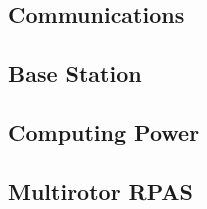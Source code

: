 \documentclass[10pt,letterpaper]{article}
\begin{document}
\subsection{Communications}\label{communications}


\subsection{Base Station}\label{base_station}


\subsection{Computing Power}\label{computing_power}


\subsection{Multirotor RPAS}\label{multirotor}


\clearpage
{}



\end{document}
